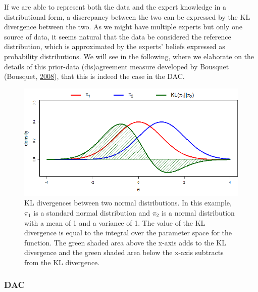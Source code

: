 \documentclass[openright,titlepage,12pt,a4paper]{book}
\begin{document}
If we are able to represent both the data and the expert knowledge in a distributional form, a discrepancy between the two can be expressed by the KL divergence between the two. As we might have multiple experts but only one source of data, it seems natural that the data be considered the reference distribution, which is approximated by the experts' beliefs expressed as probability distributions. We will see in the following, where we elaborate on the details of this prior-data (dis)agreement measure developed by Bousquet (Bousquet, \protect\hyperlink{ref-bousquet_diagnostics_2008}{2008}), that this is indeed the case in the DAC.

\begin{figure}

{\centering \includegraphics[width=0.9\linewidth]{figures/chapter_3/Figure1} 

}

\caption{KL divergences between two normal distributions. In this example, $\pi_1$ is a standard normal distribution and $\pi_2$ is a normal distribution with a mean of 1 and a variance of 1. The value of the KL divergence is equal to the integral over the parameter space for the function. The green shaded area above the x-axis adds to the KL divergence and the green shaded area below the x-axis subtracts from the KL divergence.}\label{fig:ch03fig1}
\end{figure}

\hypertarget{noninformativepriors}{%
\subsubsection{DAC}\label{noninformativepriors}}
\end{document}
